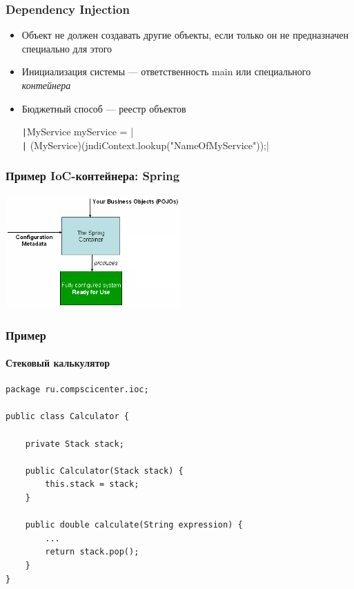 \documentclass{../mcsslides}
\begin{document}
    \begin{frame}
        \frametitle{Dependency Injection}
        \begin{itemize}
            \item Объект не должен создавать другие объекты, если только он не предназначен специально для этого
            \item Инициализация системы --- ответственность main или специального \textit{контейнера}
            \item Бюджетный способ --- реестр объектов

                \texttt|MyService myService = | \\
                \texttt|    (MyService)(jndiContext.lookup("NameOfMyService"));|
        \end{itemize}
    \end{frame}

    \begin{frame}
        \frametitle{Пример IoC-контейнера: Spring}
        \begin{center}
            \includegraphics[width=0.5\textwidth]{springIoC.png}
        \end{center}
    \end{frame}

    \begin{frame}[fragile]
        \frametitle{Пример}
        \framesubtitle{Стековый калькулятор}
        \begin{small}
            \begin{verbatim}
package ru.compscicenter.ioc;

public class Calculator {

    private Stack stack;

    public Calculator(Stack stack) {
        this.stack = stack;
    }

    public double calculate(String expression) {
        ...
        return stack.pop();
    }
}
            \end{verbatim}
        \end{small}
    \end{frame}
\end{document}
